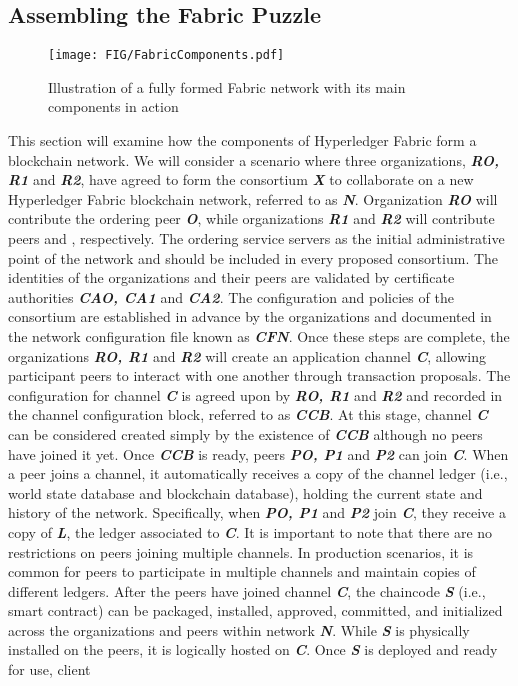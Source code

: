 \documentclass[conference]{IEEEtran}
\begin{document}
\subsection{Assembling the Fabric Puzzle}
%
\begin{figure*}
    \centering
    \texttt{[image: FIG/FabricComponents.pdf]}
    \caption{Illustration of a fully formed Fabric network with its main components in action}
    \label{fig:fabricComponents}
\end{figure*}
%
This section will examine how the components of Hyperledger Fabric form a blockchain network. We will consider a scenario where three organizations, \textbf{\textit{RO, R1}} and \textbf{\textit{R2}}, have agreed to form the consortium \textbf{\textit{X}} to collaborate on a new Hyperledger Fabric blockchain network, referred to as \textbf{\textit{N}}. Organization \textbf{\textit{RO}} will contribute the ordering peer \textbf{\textit{O}}, while  organizations \textbf{\textit{R1}} and \textbf{\textit{R2}} will contribute peers \textbf{} and \textbf{}, respectively. The ordering service servers as the initial administrative point of the network and should be included in every proposed consortium. The identities of the organizations and their peers are validated by certificate authorities \textbf{\textit{CAO, CA1}} and \textbf{\textit{CA2}}. The configuration and policies of the consortium are established in advance by the organizations and documented in the network configuration file known as \textbf{\textit{CFN}}. Once these steps are complete, the organizations \textbf{\textit{RO, R1}} and \textbf{\textit{R2}} will create an application channel \textbf{\textit{C}}, allowing participant peers to interact with one another through transaction proposals. The configuration for channel \textbf{\textit{C}} is agreed upon by \textbf{\textit{RO, R1}} and \textbf{\textit{R2}} and recorded in the channel configuration block, referred to as \textbf{\textit{CCB}}. At this stage, channel  \textbf{\textit{C}}  can be considered created simply by the existence of \textbf{\textit{CCB}} although no peers have joined it yet. Once \textbf{\textit{CCB}} is ready, peers \textbf{\textit{PO, P1}} and \textbf{\textit{P2}} can join \textbf{\textit{C}}. When a peer joins a channel, it automatically receives a copy of the channel ledger (i.e., world state database and blockchain database), holding the current state and history of the network. Specifically, when \textbf{\textit{PO, P1}} and \textbf{\textit{P2}} join \textbf{\textit{C}}, they receive a copy of \textbf{\textit{L}}, the ledger associated to \textbf{\textit{C}}. It is important to note that there are no restrictions on peers joining multiple channels. In production scenarios, it is common for peers to participate in multiple channels and maintain copies of different ledgers. After the peers have joined channel \textbf{\textit{C}}, the chaincode \textbf{\textit{S}} (i.e., smart contract) can be packaged, installed, approved, committed, and initialized across the organizations and peers within network \textbf{\textit{N}}. While \textbf{\textit{S}} is physically installed on the peers, it is logically hosted on \textbf{\textit{C}}. Once \textbf{\textit{S}} is deployed and ready for use, client 
\end{document}
